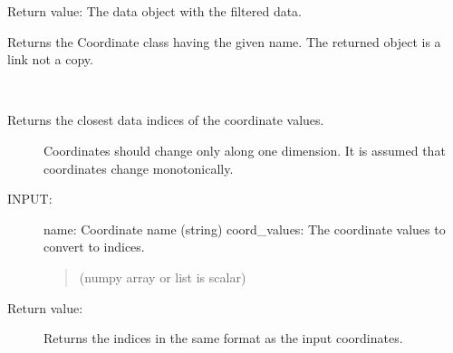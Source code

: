 \documentclass[letterpaper,10pt,english]{sphinxmanual}
\begin{document}
\begin{fulllineitems}
\begin{fulllineitems}
\begin{quote}
\begin{description}
\end{description}
\end{quote}

Return value: The data object with the filtered data.

\end{fulllineitems}


\begin{fulllineitems}
\label{\detokenize{data_object:flap.data_object.DataObject.get_coordinate_object}}
Returns the Coordinate class having the given name. The returned object is a link not a copy.

\end{fulllineitems}


\begin{fulllineitems}
\label{\detokenize{data_object:flap.data_object.DataObject.index_from_coordinate}}~\begin{description}
\item[{Returns the closest data indices of the coordinate values.}] \leavevmode
Coordinates should change only along one dimension.
It is assumed that coordinates change monotonically.

\item[{INPUT:}] \leavevmode
name: Coordinate name (string)
coord\_values: The coordinate values to convert to indices.
\begin{quote}

(numpy array or list is scalar)
\end{quote}

\item[{Return value:}] \leavevmode
Returns the indices in the same format as the input coordinates.

\end{description}

\end{fulllineitems}


\end{fulllineitems}
\end{document}
